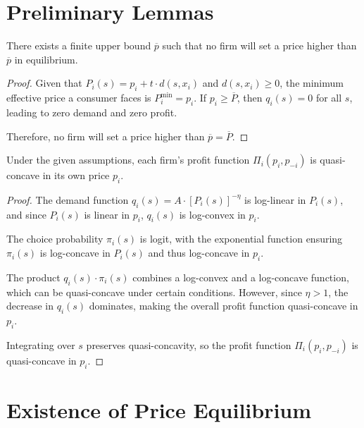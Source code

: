 \section{Preliminary Lemmas}

\begin{lemma}
\label{lem:price_bounds}
There exists a finite upper bound \( \overline{p} \) such that no firm will set a price higher than \( \overline{p} \) in equilibrium.
\end{lemma}

\begin{proof}
Given that \( P_i(s) = p_i + t \cdot d(s, x_i) \) and \( d(s, x_i) \geq 0 \), the minimum effective price a consumer faces is \( P_i^{\text{min}} = p_i \). If \( p_i \geq \overline{P} \), then \( q_i(s) = 0 \) for all \( s \), leading to zero demand and zero profit.

Therefore, no firm will set a price higher than \( \overline{p} = \overline{P} \).
\end{proof}

\begin{lemma}
\label{lem:profit_quasi_concave_price}
Under the given assumptions, each firm's profit function \( \Pi_i(p_i, p_{-i}) \) is quasi-concave in its own price \( p_i \).
\end{lemma}

\begin{proof}
The demand function \( q_i(s) = A \cdot [P_i(s)]^{-\eta} \) is log-linear in \( P_i(s) \), and since \( P_i(s) \) is linear in \( p_i \), \( q_i(s) \) is log-convex in \( p_i \).

The choice probability \( \pi_i(s) \) is logit, with the exponential function ensuring \( \pi_i(s) \) is log-concave in \( P_i(s) \) and thus log-concave in \( p_i \).

The product \( q_i(s) \cdot \pi_i(s) \) combines a log-convex and a log-concave function, which can be quasi-concave under certain conditions. However, since \( \eta > 1 \), the decrease in \( q_i(s) \) dominates, making the overall profit function quasi-concave in \( p_i \).

Integrating over \( s \) preserves quasi-concavity, so the profit function \( \Pi_i(p_i, p_{-i}) \) is quasi-concave in \( p_i \).
\end{proof}

\section{Existence of Price Equilibrium}

